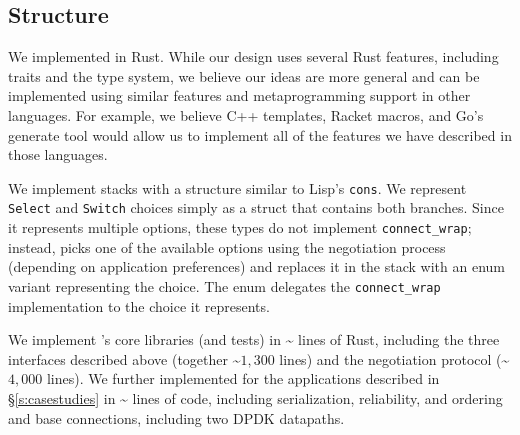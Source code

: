 \subsection{\name Structure}\label{s:impl:structure}
We implemented \name in Rust. While our design uses several Rust features, including traits and the type system, we believe our ideas are more general and can be implemented using similar features and metaprogramming support in other languages. For example, we believe C++ templates, Racket macros, and Go's generate tool would allow us to implement all of the features we have described in those languages.

We implement \tunnel stacks with a structure similar to Lisp's \texttt{cons}. We represent \texttt{Select} and \texttt{Switch} choices simply as a struct that contains both branches.  Since it represents multiple options, these types do not implement \texttt{connect\_wrap}; instead, \name picks one of the available options using the negotiation process (depending on application preferences) and replaces it in the \tunnel stack with an enum variant representing the choice. The enum delegates the \texttt{connect\_wrap} implementation to the choice it represents.



We implement \name's core libraries (and tests) in \textasciitilde{} lines of Rust, including the three interfaces described above (together \textasciitilde$1,300$ lines) and the negotiation protocol (\textasciitilde$4,000$ lines).
We further implemented \tunnels for the applications described in \S\ref{s:casestudies} in \textasciitilde {} lines of code, including serialization, reliability, and ordering and base connections, including two DPDK datapaths.

